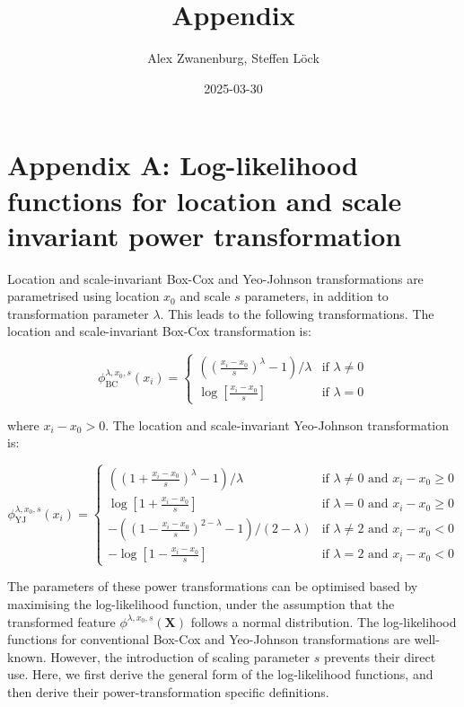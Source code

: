 \documentclass[
  a4paper,
]{article}
\title{Appendix}
\author{Alex Zwanenburg, Steffen Löck}
\date{2025-03-30}
\begin{document}
\maketitle

\section{Appendix A: Log-likelihood functions for location and scale
invariant power
transformation}\label{appendix-a-log-likelihood-functions-for-location-and-scale-invariant-power-transformation}

Location and scale-invariant Box-Cox and Yeo-Johnson transformations are
parametrised using location \(x_0\) and scale \(s\) parameters, in
addition to transformation parameter \(\lambda\). This leads to the
following transformations. The location and scale-invariant Box-Cox
transformation is:

\begin{equation}
\phi_{\text{BC}}^{\lambda, x_0, s} (x_i) = 
\begin{cases}
\left( \left(\frac{x_i - x_0}{s} \right)^\lambda - 1 \right) / \lambda & \text{if } \lambda \neq 0\\
\log\left[\frac{x_i - x_0}{s}\right] & \text{if } \lambda = 0
\end{cases}
\end{equation}

where \(x_i - x_0 > 0\). The location and scale-invariant Yeo-Johnson
transformation is:

\begin{equation}
\phi_{\text{YJ}}^{\lambda, x_0, s} (x_i) = 
\begin{cases}
\left( \left( 1 + \frac{x_i - x_0}{s}\right)^\lambda - 1\right) / \lambda & \text{if } \lambda \neq 0 \text{ and } x_i - x_0 \geq 0\\
\log\left[1 + \frac{x_i - x_0}{s}\right] & \text{if } \lambda = 0 \text{ and } x_i - x_0 \geq 0\\
-\left( \left( 1 - \frac{x_i - x_0}{s}\right)^{2 - \lambda} - 1 \right) / \left(2 - \lambda \right) & \text{if } \lambda \neq 2 \text{ and } x_i - x_0 < 0\\
-\log\left[1 - \frac{x_i - x_0}{s}\right] & \text{if } \lambda = 2 \text{ and } x_i - x_0 < 0
\end{cases}
\end{equation}

The parameters of these power transformations can be optimised based by
maximising the log-likelihood function, under the assumption that the
transformed feature \(\phi^{\lambda, x_0, s} (\mathbf{X})\) follows a
normal distribution. The log-likelihood functions for conventional
Box-Cox and Yeo-Johnson transformations are well-known. However, the
introduction of scaling parameter \(s\) prevents their direct use. Here,
we first derive the general form of the log-likelihood functions, and
then derive their power-transformation specific definitions.
\end{document}
